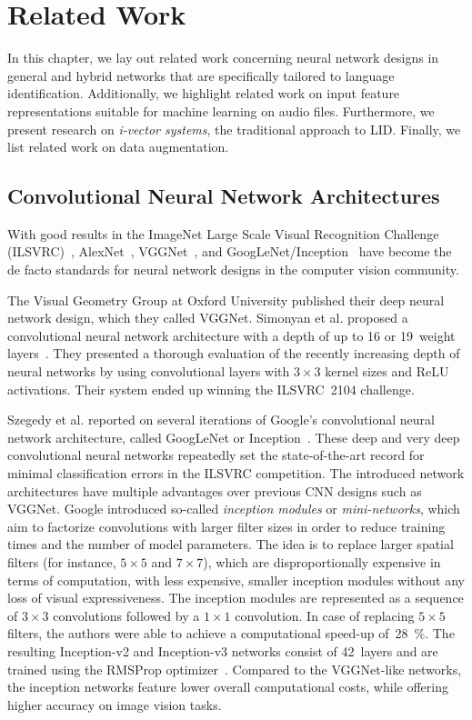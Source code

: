 \section{Related Work}
\label{sec:related_work}
In this chapter, we lay out related work concerning neural network designs in general and hybrid networks that are specifically tailored to language identification. Additionally, we highlight related work on input feature representations suitable for machine learning on audio files. Furthermore, we present research on \emph{i-vector systems}, the traditional approach to LID. Finally, we list related work on data augmentation.

\subsection{Convolutional Neural Network Architectures}
With good results in the ImageNet Large Scale Visual Recognition Challenge (ILSVRC)~\cite{ILSVRC15}, AlexNet~\cite{krizhevsky2012imagenet}, VGGNet~\cite{simonyan2014very}, and GoogLeNet/Inception~\cite{szegedy2015going} have become the de facto standards for neural network designs in the computer vision community.

The Visual Geometry Group at Oxford University published their deep neural network design, which they called VGGNet. Simonyan et al. proposed a convolutional neural network architecture with a depth of up to \num{16} or \num{19}~weight layers~\cite{simonyan2014very, Chatfield14}. They presented a thorough evaluation of the recently increasing depth of neural networks by using convolutional layers with $3 \times 3$ kernel sizes and ReLU activations. Their system ended up winning the ILSVRC~2104 challenge.

Szegedy et al. reported on several iterations of Google's convolutional neural network architecture, called GoogLeNet or Inception~\cite{szegedy2015going, szegedy2016rethinking, szegedy2016inception}. These deep and very deep convolutional neural networks repeatedly set the state-of-the-art record for minimal classification errors in the ILSVRC competition. The introduced network architectures have multiple advantages over previous CNN designs such as VGGNet. Google introduced so-called \emph{inception modules} or \emph{mini-networks}, which aim to factorize convolutions with larger filter sizes in order to reduce training times and the number of model parameters. The idea is to replace larger spatial filters (for instance, $5 \times 5$ and $7 \times 7$), which are disproportionally expensive in terms of computation, with less expensive, smaller inception modules without any loss of visual expressiveness. The inception modules are represented as a sequence of $3 \times 3$ convolutions followed by a $1 \times 1$ convolution. In case of replacing $5 \times 5$ filters, the authors were able to achieve a computational speed-up of~\SI{28}{\percent}. The resulting Inception-v2 and Inception-v3 networks consist of \num{42}~layers and are trained using the RMSProp optimizer~\cite{tieleman2012lecture}. Compared to the VGGNet-like networks, the inception networks feature lower overall computational costs, while offering higher accuracy on image vision tasks.

